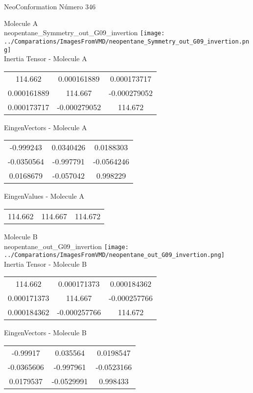 \vtab[-2cm]
\begin{center}
{\large NeoConformation \tab Número 346}
\end{center}
\begin{multicols}{2}
\begin{center}

Molecule A \\ 
neopentane\_Symmetry\_out\_G09\_invertion
\texttt{[image: ../Comparations/ImagesFromVMD/neopentane\_Symmetry\_out\_G09\_invertion.png]}
\\
Inertia Tensor - Molecule A \\
\vtab

\begin{tabular}{|c c c|}
114.662	 & 	0.000161889	 & 	0.000173717	 \\
0.000161889	 & 	114.667	 & 	-0.000279052	 \\
0.000173717	 & 	-0.000279052	 & 	114.672
\end{tabular}

\vtab
 EingenVectors - Molecule A     \\
\vtab
\begin{tabular}{|c c c|}
-0.999243	 & 	0.0340426	 & 	0.0188303	 \\
-0.0350564	 & 	-0.997791	 & 	-0.0564246	 \\
0.0168679	 & 	-0.057042	 & 	0.998229
\end{tabular}

\vtab
 EingenValues - Molecule A     \\
\vtab
\begin{tabular}{|c c c|}
114.662	 & 	114.667	 & 	114.672	 \\
\end{tabular}
\columnbreak

Molecule B \\ 
neopentane\_out\_G09\_invertion
\texttt{[image: ../Comparations/ImagesFromVMD/neopentane\_out\_G09\_invertion.png]}
\\
Inertia Tensor - Molecule B \\
\vtab

\begin{tabular}{|c c c|}
114.662	 & 	0.000171373	 & 	0.000184362	 \\
0.000171373	 & 	114.667	 & 	-0.000257766	 \\
0.000184362	 & 	-0.000257766	 & 	114.672
\end{tabular}

\vtab
 EingenVectors - Molecule B     \\
\vtab
\begin{tabular}{|c c c|}
-0.99917	 & 	0.035564	 & 	0.0198547	 \\
-0.0365606	 & 	-0.997961	 & 	-0.0523166	 \\
0.0179537	 & 	-0.0529991	 & 	0.998433
\end{tabular}


\end{center}
\end{multicols}
